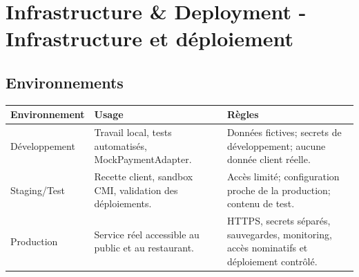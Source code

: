 \documentclass[10pt,a4paper]{article}
\begin{document}
\section{Infrastructure \& Deployment - Infrastructure et déploiement}
\subsection{Environnements}
\begin{tabularx}{\linewidth}{@{}L{3cm}Y Y@{}}
\toprule
\textbf{Environnement} & \textbf{Usage} & \textbf{Règles} \\
\midrule
Développement & Travail local, tests automatisés, MockPaymentAdapter. & Données fictives; secrets de développement; aucune donnée client réelle. \\
Staging/Test & Recette client, sandbox CMI, validation des déploiements. & Accès limité; configuration proche de la production; contenu de test. \\
Production & Service réel accessible au public et au restaurant. & HTTPS, secrets séparés, sauvegardes, monitoring, accès nominatifs et déploiement contrôlé. \\
\bottomrule
\end{tabularx}
\end{document}
